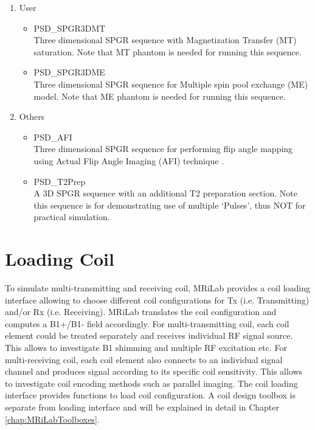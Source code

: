 \documentclass{book}%
\begin{document}
\begin{enumerate}
\item User
\begin{itemize}
	\item PSD\_SPGR3DMT \\
	Three dimensional SPGR sequence with Magnetization Transfer (MT) saturation. Note that MT phantom is needed for running this sequence.
	\item PSD\_SPGR3DME \\
	Three dimensional SPGR sequence for Multiple spin pool exchange (ME) model. Note that ME phantom is needed for running this sequence.
\end{itemize}

\item Others
\begin{itemize}
	\item PSD\_AFI \\
	Three dimensional SPGR sequence for performing flip angle mapping using Actual Flip Angle Imaging (AFI) technique \cite{Yarnykh2007}.
	\item PSD\_T2Prep \\
	A 3D SPGR sequence with an additional T2 preparation section. Note this sequence is for demonstrating use of multiple `Pulses', thus NOT for practical simulation.
\end{itemize}

\end{enumerate}


\section{Loading Coil}
To simulate multi-transmitting and receiving coil, MRiLab provides a coil loading interface allowing to choose different coil configurations for Tx (i.e. Transmitting) and/or Rx (i.e. Receiving). MRiLab translates the coil configuration and computes a B1+/B1- field accordingly. For multi-transmitting coil, each coil element could be treated separately and receives individual RF signal source. This allows to investigate B1 shimming and multiple RF excitation etc. For multi-receiving coil, each coil element also connects to an individual signal channel and produces signal according to its specific coil sensitivity. This allows to investigate coil encoding methods such as parallel imaging. The coil loading interface provides functions to load coil configuration. A coil design toolbox is separate from loading interface and will be explained in detail in Chapter \ref{chap:MRiLabToolboxes}.
\end{document}
